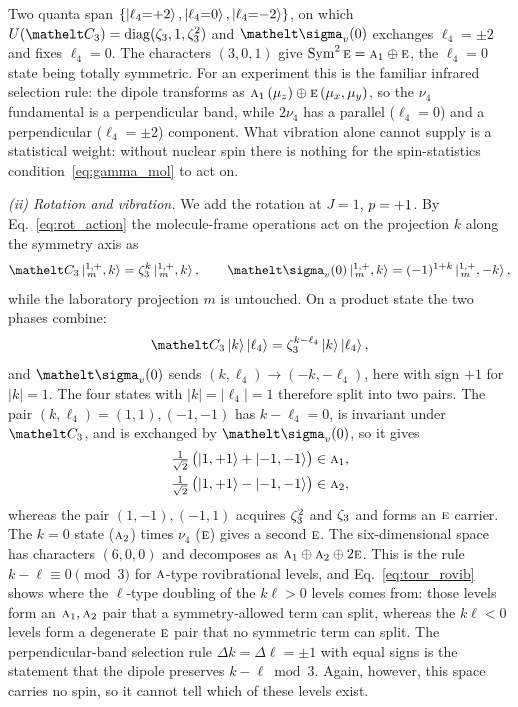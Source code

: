 Two quanta span $\{\ket{\ell_4{=}{+2}},\ket{\ell_4{=}0},\ket{\ell_4{=}{-2}}\}$, on which $U(\elt{C_{3}})=\diag(\rootunity{3},1,\rootunity{3}^{2})$ and $\elt{\sigma_{v}}(0)$ exchanges $\ell_4=\pm2$ and fixes $\ell_4=0$. The characters $(3,0,1)$ give $\operatorname{Sym}^{2}\text{\normalfont\scshape e}=\text{\normalfont\scshape a}_{1}\oplus \text{\normalfont\scshape e}$, the $\ell_4=0$ state being totally symmetric. For an experiment this is the familiar infrared selection rule: the dipole transforms as $\text{\normalfont\scshape a}_{1}\,(\mu_z)\oplus \text{\normalfont\scshape e}\,(\mu_x,\mu_y)$, so the $\nu_4$ fundamental is a perpendicular band, while $2\nu_4$ has a parallel ($\ell_4=0$) and a perpendicular ($\ell_4=\pm2$) component. What vibration alone cannot supply is a statistical weight: without nuclear spin there is nothing for the spin-statistics condition~\eqref{eq:gamma_mol} to act on.

\emph{(ii) Rotation and vibration.} We add the rotation at $J=1$, $p=+1$. By Eq.~\eqref{eq:rot_action} the molecule-frame operations act on the projection $k$ along the symmetry axis as
\begin{equation}
\elt{C_{3}}\ket{{}^{1,+}_{\,m},k}=\rootunity{3}^{k}\ket{{}^{1,+}_{\,m},k},\qquad
\elt{\sigma_{v}}(0)\ket{{}^{1,+}_{\,m},k}=(-1)^{1+k}\ket{{}^{1,+}_{\,m},-k},
\label{eq:tour_rot}
\end{equation}
while the laboratory projection $m$ is untouched. On a product state the two phases combine: $$\elt{C_{3}}\ket{k}\ket{\ell_4}=\rootunity{3}^{k-\ell_4}\ket{k}\ket{\ell_4},$$ and $\elt{\sigma_{v}}(0)$ sends $(k,\ell_4)\to(-k,-\ell_4)$, here with sign $+1$ for $|k|=1$. The four states with $|k|=|\ell_4|=1$ therefore split into two pairs. The pair $(k,\ell_4)=(1,1),(-1,-1)$ has $k-\ell_4=0$, is invariant under $\elt{C_{3}}$, and is exchanged by $\elt{\sigma_{v}}(0)$, so it gives
\begin{equation}
\begin{aligned}
    \tfrac{1}{\sqrt{2}}\,\bigl(\ket{1,{+1}}+\ket{{-1},{-1}}\bigr)\in \text{\normalfont\scshape a}_{1},\\
    \tfrac{1}{\sqrt{2}}\,\bigl(\ket{1,{+1}}-\ket{{-1},{-1}}\bigr)\in \text{\normalfont\scshape a}_{2},
\end{aligned}
\label{eq:tour_rovib}
\end{equation}
whereas the pair $(1,-1),(-1,1)$ acquires $\zeta_{3}^{2}$ and $\zeta_{3}$ and forms an $\text{\normalfont\scshape e}$ carrier. The $k=0$ state ($\text{\normalfont\scshape a}_{2}$) times $\nu_4$ ($\text{\normalfont\scshape e}$) gives a second $\text{\normalfont\scshape e}$. The six-dimensional space has characters $(6,0,0)$ and decomposes as $\text{\normalfont\scshape a}_{1}\oplus \text{\normalfont\scshape a}_{2}\oplus2\text{\normalfont\scshape e}$. This is the rule $k-\ell\equiv0\pmod 3$ for $\text{\normalfont\scshape a}$-type rovibrational levels, and Eq.~\eqref{eq:tour_rovib} shows where the $\ell$-type doubling of the $k\ell>0$ levels comes from: those levels form an $\text{\normalfont\scshape a}_{1},\text{\normalfont\scshape a}_{2}$ pair that a symmetry-allowed term can split, whereas the $k\ell<0$ levels form a degenerate $\text{\normalfont\scshape e}$ pair that no symmetric term can split. The perpendicular-band selection rule $\Delta k=\Delta\ell=\pm1$ with equal signs is the statement that the dipole preserves $k-\ell\bmod3$. Again, however, this space carries no spin, so it cannot tell which of these levels exist.

